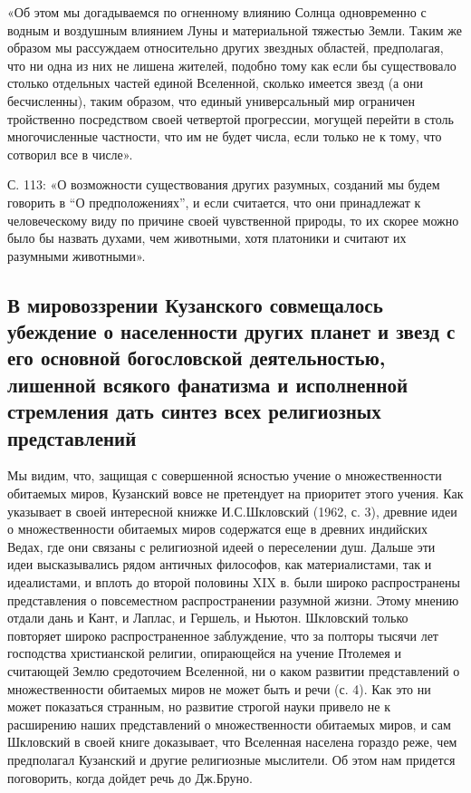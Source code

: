 «Об этом  мы догадываемся по  огненному влиянию Солнца  одновременно с
водным и воздушным влиянием Луны  и материальной тяжестью Земли. Таким
же  образом  мы  рассуждаем  относительно  других  звездных  областей,
предполагая, что  ни одна из них  не лишена жителей, подобно  тому как
если  бы  существовало  столько  отдельных  частей  единой  Вселенной,
сколько имеется звезд  (а они бесчисленны), таким  образом, что единый
универсальный  мир ограничен  тройственно посредством  своей четвертой
прогрессии, могущей  перейти в столь многочисленные  частности, что им
не будет числа, если только не к тому, что сотворил все в числе».

С.  113: «О  возможности  существования других  разумных, созданий  мы
будем  говорить в  ``О  предположениях'', и  если  считается, что  они
принадлежат к человеческому виду по причине своей чувственной природы,
то  их  скорее можно  было  бы  назвать  духами, чем  животными,  хотя
платоники и считают их разумными животными».

\subsection{В   мировоззрении  Кузанского   совмещалось  убеждение   о
населенности  других  планет  и  звезд  с  его  основной  богословской
деятельностью,  лишенной всякого  фанатизма  и исполненной  стремления
дать синтез всех религиозных представлений}

Мы видим, что, защищая с совершенной ясностью учение о множественности
обитаемых  миров, Кузанский  вовсе  не претендует  на приоритет  этого
учения. Как  указывает в своей интересной  книжке И.С.Шкловский (1962,
с. 3), древние  идеи о множественности обитаемых  миров содержатся еще
в  древних  индийских  Ведах,  где они  связаны  с  религиозной  идеей
о  переселении  душ.  Дальше  эти идеи  высказывались  рядом  античных
философов,  как  материалистами,  так   и  идеалистами,  и  вплоть  до
второй  половины XIX  в.  были широко  распространены представления  о
повсеместном  распространении  разумной  жизни.  Этому  мнению  отдали
дань  и  Кант,  и  Лаплас,  и  Гершель,  и  Ньютон.  Шкловский  только
повторяет широко  распространенное заблуждение, что за  полторы тысячи
лет господства  христианской религии,  опирающейся на  учение Птолемея
и  считающей   Землю  средоточием  Вселенной,  ни   о  каком  развитии
представлений о множественности  обитаемых миров не может  быть и речи
(с.  4). Как  это ни  может показаться  странным, но  развитие строгой
науки привело  не к  расширению наших представлений  о множественности
обитаемых  миров,  и  сам  Шкловский в  своей  книге  доказывает,  что
Вселенная населена  гораздо реже,  чем предполагал Кузанский  и другие
религиозные мыслители.  Об этом нам придется  поговорить, когда дойдет
речь до Дж.Бруно.

